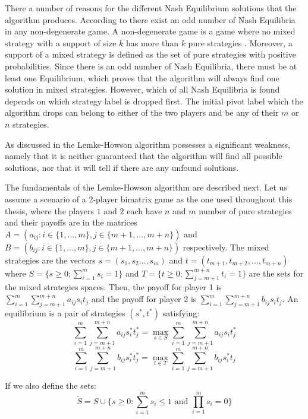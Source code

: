 There a number of reasons for the different Nash Equilibrium solutions that the algorithm produces. According to \citet{lemke1964equilibrium} there exist an odd number of Nash Equilibria in any non-degenerate game. A non-degenerate game is a game where no mixed strategy with a support of size $k$ has more than $k$ pure strategies \citep{nisan2007algorithmic}. Moreover, a support of a mixed strategy is defined as the set of pure strategies with positive probabilities. Since there is an odd number of Nash Equilibria, there must be at least one Equilibrium, which proves that the algorithm will always find one solution in mixed strategies. However, which of all Nash Equilibria is found depends on which strategy label is dropped first. The initial pivot label which the algorithm drops can belong to either of the two players and be any of their $m$ or $n$ strategies.

As discussed in \citet{shapley1974note} the Lemke-Howson algorithm possesses a significant weakness, namely that it is neither guaranteed that the algorithm will find all possible solutions, nor that it will tell if there are any unfound solutions.

The fundamentals of the Lemke-Howson algorithm are described next. Let us assume a scenario of a 2-player bimatrix game as the one used throughout this thesis, where the players $1$ and $2$ each have $n$ and $m$ number of pure strategies and their payoffs are in the matrices $A = (a_{ij}: i \in \{1,...,m\}, j \in \{ m+1,...,m+n\})$ and $B = (b_{ij}: i \in \{1,...,m\}, j \in \{m+1,...,m+n\})$ respectively. The mixed strategies are the vectors $s=(s_1,s_2...,s_m)$ and $t=(t_{m+1},t_{m+2},...,t_{m+n})$ where $S = \{s \geq 0; \sum_{i=1}^{m}s_i = 1\}$ and $T = \{t \geq 0; \sum_{j=m+1}^{m+n}t_i = 1\}$ are the sets for the mixed strategies spaces. Then, the payoff for player 1 is $\sum_{i=1}^{m}\sum_{j=m+1}^{m+n} a_{ij} s_i t_j$ and the payoff for player 2 is $\sum_{i=1}^{m} \sum_{j=m+1}^{m+n} b_{ij} s_i t_j$. An equilibrium is a pair of strategies $(s^*,t^*)$ satisfying:
\begin{equation}
\sum_{i=1}^{m} \sum_{j=m+1}^{m+n} a_{ij}s_i^*t_j^* = \max_{s \in S} \sum_{i=1}^{m} \sum_{j=m+1}^{m+n} a_{ij}s_i t_j^*
\end{equation}
\begin{equation}
\sum_{i=1}^{m} \sum_{j=m+1}^{m+n} b_{ij}s_i^*t_j^* = \max_{t \in T} \sum_{i=1}^{m} \sum_{j=m+1}^{m+n} b_{ij}s_i^* t_j
\end{equation}


If we also define the sets:
\begin{equation}
\tilde{S} =  S \cup \{ s \geq 0: \sum_{i=1}^{m} s_i \leq 1 \text{ and } \prod_{i=1}^{m} s_i = 0 \}
\end{equation}

